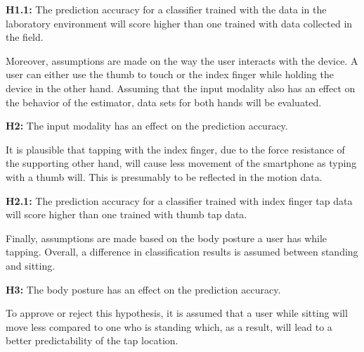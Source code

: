 \begin{center}
  \begin{framed}
    \textbf{H1.1:} The prediction accuracy for a classifier trained with the data in the laboratory environment will score higher than one trained with data collected in the field.
  \end{framed}
\end{center}

Moreover, assumptions are made on the way the user interacts with the device. A user can either use the thumb to touch or the index finger while holding the device in the other hand. Assuming that the input modality also has an effect on the behavior of the estimator, data sets for both hands will be evaluated.

\begin{center}
  \begin{mdframed}[backgroundcolor=gray!10]
    \textbf{H2:} The input modality has an effect on the prediction accuracy.
  \end{mdframed}
\end{center}

It is plausible that tapping with the index finger, due to the force resistance of the supporting other hand, will cause less movement of the smartphone as typing with a thumb will. This is presumably to be reflected in the motion data.

\begin{center}
  \begin{framed}
    \textbf{H2.1:} The prediction accuracy for a classifier trained with index finger tap data will score higher than one trained with thumb tap data.
  \end{framed}
\end{center}

Finally, assumptions are made based on the body posture a user has while tapping. Overall, a difference in classification results is assumed between standing and sitting.
\begin{center}
  \begin{mdframed}[backgroundcolor=gray!10]
    \textbf{H3:} The body posture has an effect on the prediction accuracy.
  \end{mdframed}
\end{center}

To approve or reject this hypothesis, it is assumed that a user while sitting will move less compared to one who is standing which, as a result, will lead to a better predictability of the tap location.

